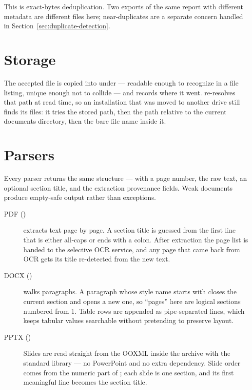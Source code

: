 This is exact-bytes deduplication. Two exports of the same report with different
metadata are different files here; near-duplicates are a separate concern
handled in Section~\ref{sec:duplicate-detection}.

\section{Storage}

The accepted file is copied into  under
 --- readable
enough to recognize in a file listing, unique enough not to collide --- and
 records where it went.
 re-resolves that path at read time, so an
installation that was moved to another drive still finds its files: it tries the
stored path, then the path relative to the current documents directory, then the
bare file name inside it.

\section{Parsers}

Every parser returns the same structure ---  with a
page number, the raw text, an optional section title, and the extraction
provenance fields. Weak documents produce empty-safe output rather than
exceptions.

\begin{description}
\item[PDF ()]  extracts text page by
page. A section title is guessed from the first line that is either all-caps or
ends with a colon. After extraction the page list is handed to the selective OCR
service, and any page that came back from OCR gets its title re-detected from
the new text.

\item[DOCX ()]  walks
paragraphs. A paragraph whose style name starts with  closes the
current section and opens a new one, so ``pages'' here are logical sections
numbered from 1. Table rows are appended as pipe-separated lines, which keeps
tabular values searchable without pretending to preserve layout.

\item[PPTX ()] Slides are read straight from
the OOXML inside the  archive with the standard library --- no
PowerPoint and no extra dependency. Slide order comes from the numeric part of
; each slide is one section, and its first
meaningful line becomes the section title.
\end{description}

